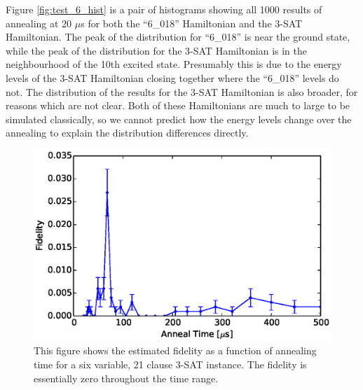 Figure \ref{fig:test_6_hist} is a pair of histograms showing all 1000 results of annealing at 20 $\mu$s for both the ``6\_018'' Hamiltonian and the 3-SAT Hamiltonian.  The peak of the distribution for ``6\_018'' is near the ground state, while the peak of the distribution for the 3-SAT Hamiltonian is in the neighbourhood of the 10th excited state.  Presumably this is due to the energy levels of the 3-SAT Hamiltonian closing together where the ``6\_018'' levels do not.  The distribution of the results for the 3-SAT Hamiltonian is also broader, for reasons which are not clear.  Both of these Hamiltonians are much to large to be simulated classically, so we cannot predict how the energy levels change over the annealing to explain the distribution differences directly.

\begin{figure}
	\includegraphics{img/test_6.eps}
	\caption[Result of a 6 Variable 3-SAT Instance]{This figure shows the estimated fidelity as a function of annealing time for a six variable, 21 clause 3-SAT instance.  The fidelity is essentially zero throughout the time range.}
	\label{fig:test_6}
\end{figure}

